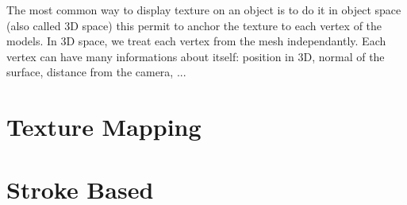 The most common way to display texture on an object is to do it in object space (also called 3D space) this permit to anchor the texture to each vertex of the models. In 3D space, we treat each vertex from the mesh independantly. Each vertex can have many informations about itself: position in 3D, normal of the surface, distance from the camera, ...


\section{Texture Mapping}

\section{Stroke Based}

